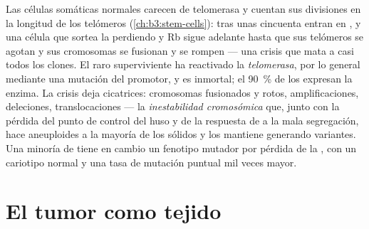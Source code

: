 \begin{definition}\label{def:b3:cancer-biology:telomerase}
Las células somáticas normales carecen de telomerasa y cuentan sus
divisiones en la longitud de los telómeros (\cref{ch:b3:stem-cells}):
tras unas cincuenta entran en , y una célula que sortea la
 perdiendo  y Rb sigue adelante hasta que sus telómeros se
agotan y sus cromosomas se fusionan y se rompen --- una crisis que mata a
casi todos los clones. El raro superviviente ha reactivado la
\emph{telomerasa}, por lo general mediante una mutación del promotor, y
es inmortal; el \qty{90}{\%} de los  expresan la enzima. La
crisis deja cicatrices: cromosomas fusionados y rotos, amplificaciones,
deleciones, translocaciones --- la \emph{inestabilidad cromosómica} que,
junto con la pérdida del punto de control del huso y de la respuesta de
 a la mala segregación, hace aneuploides a la mayoría de los 
sólidos y los mantiene generando variantes. Una minoría de  tiene
en cambio un fenotipo mutador por pérdida de la , con un cariotipo normal y una tasa de mutación puntual mil
veces mayor.
\end{definition}

\section{El tumor como tejido}

